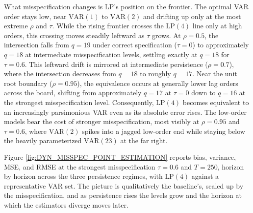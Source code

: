 What misspecification changes is LP's position on the frontier. The optimal VAR order stays low, 
near $\text{VAR}(1)$ to $\text{VAR}(2)$ and drifting up only at the most extreme $\rho$ and 
$\tau$. While the rising frontier crosses the $\text{LP}(4)$ line only at high orders, this crossing 
moves steadily leftward as $\tau$ grows. At $\rho=0.5$, the intersection falls from $q=19$ under 
correct specification ($\tau=0$) to approximately $q=18$ at intermediate misspecification levels, 
settling exactly at $q=18$ for $\tau=0.6$. This leftward drift is mirrored at intermediate 
persistence ($\rho=0.7$), where the intersection decreases from $q=18$ to roughly $q=17$. Near 
the unit root boundary ($\rho=0.95$), the equivalence occurs at generally lower lag orders across 
the board, shifting from approximately $q=17$ at $\tau=0$ down to $q=16$ at the strongest 
misspecification level. Consequently, $\text{LP}(4)$ becomes equivalent to an increasingly 
parsimonious VAR even as its absolute error rises. The low-order models bear the cost of stronger 
misspecification, most visibly at $\rho=0.95$ and $\tau=0.6$, where $\text{VAR}(2)$ spikes into a 
jagged low-order end while staying below the heavily parameterized $\text{VAR}(23)$ at the far right.

Figure \ref{fig:DYN_MISSPEC_POINT_ESTIMATION} reports bias, variance, MSE, and RMSE at the 
strongest misspecification $\tau=0.6$ and $T=250$, horizon by horizon across the three 
persistence regimes, with $\text{LP}(4)$ against a representative VAR set. The picture is 
qualitatively the baseline's, scaled up by the misspecification, and as persistence rises the 
levels grow and the horizon at which the estimators diverge moves later.

